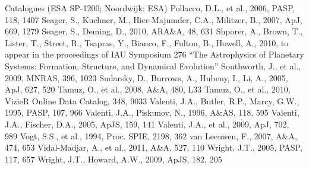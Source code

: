 \documentclass[12pt,preprint]{emulateapj}
\begin{document}
\begin{thebibliography}{}
  Catalogues (ESA SP-1200; Noordwijk: ESA)
  Pollacco, D.L., et al., 2006, PASP, 118, 1407
 Seager,
  S., Kuchner, M., Hier-Majumder, C.A., Militzer, B., 2007, ApJ, 669,
  1279
  Seager, S., Deming, D., 2010, ARA\&A, 48, 631
  Shporer, A., Brown, T., Lister, T., Street, R., Tsapras, Y., Bianco,
  F., Fulton, B., Howell, A., 2010, to appear in the proceedings of
  IAU Symposium 276 ``The Astrophysics of Planetary Systems:
  Formation, Structure, and Dynamical Evolution''
  Southworth, J., et al., 2009, MNRAS, 396, 1023
  Sudarsky, D., Burrows, A., Hubeny, I., Li, A., 2005, ApJ, 627, 520
 Tamuz,
  O., et al., 2008, A\&A, 480, L33
 Tamuz,
  O., et al., 2010, VizieR Online Data Catalog, 348, 9033
  Valenti, J.A., Butler, R.P., Marcy, G.W., 1995, PASP, 107, 966
  Valenti, J.A., Piskunov, N., 1996, A\&AS, 118, 595
  Valenti, J.A., Fischer, D.A., 2005, ApJS, 159, 141
  Valenti, J.A., et al., 2009, ApJ, 702, 989
 Vogt,
  S.S., et al., 1994, Proc. SPIE, 2198, 362
  van Leeuwen, F., 2007, A\&A, 474, 653
  Vidal-Madjar, A., et al., 2011, A\&A, 527, 110
 Wright, J.T.,
  2005, PASP, 117, 657
  Wright, J.T., Howard, A.W., 2009, ApJS, 182, 205

\end{thebibliography}
\end{document}
